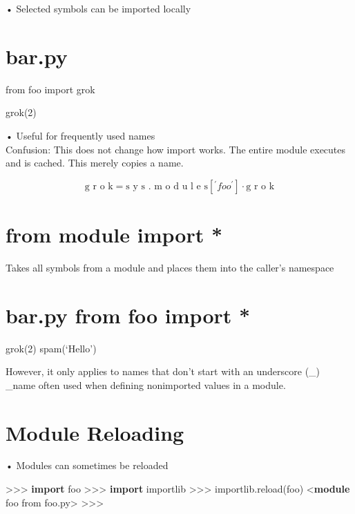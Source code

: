 \documentclass[
  letterpaper,
  DIV=11,
  numbers=noendperiod]{scrreprt}
\newenvironment{Shaded}{\begin{snugshade}}{\end{snugshade}}
\newcommand{\KeywordTok}[1]{\textcolor[rgb]{0.00,0.23,0.31}{\textbf{#1}}}
\newcommand{\NormalTok}[1]{\textcolor[rgb]{0.00,0.23,0.31}{#1}}
\newcommand{\OperatorTok}[1]{\textcolor[rgb]{0.37,0.37,0.37}{#1}}
\begin{document}
• Selected symbols can be imported locally


\chapter{bar.py}\label{bar.py}

from foo import grok

grok(2)

• Useful for frequently used names\\
Confusion: This does not change how import works. The entire module
executes and is cached. This merely copies a name.

\[
\text {g r o k} = \text {s y s . m o d u l e s} [ ^ {\prime} f o o ^ {\prime} ] \cdot \text {g r o k}
\]


\chapter{from module import *}\label{from-module-import-4}

Takes all symbols from a module and places them into the caller's
namespace


\chapter{bar.py from foo import *}\label{bar.py-from-foo-import}

grok(2) spam(`Hello')

However, it only applies to names that don't start with an underscore
(\_)\\
\_name often used when defining nonimported values in a module.


\chapter{Module Reloading}\label{module-reloading}

• Modules can sometimes be reloaded

\begin{Shaded}
\begin{Highlighting}[]
\OperatorTok{\textgreater{}\textgreater{}\textgreater{}} \KeywordTok{import}\NormalTok{ foo   }
\OperatorTok{\textgreater{}\textgreater{}\textgreater{}} \KeywordTok{import}\NormalTok{ importlib   }
\OperatorTok{\textgreater{}\textgreater{}\textgreater{}}\NormalTok{ importlib}\OperatorTok{.}\NormalTok{reload(foo)   }
\OperatorTok{\textless{}}\KeywordTok{module}\NormalTok{ \textquotesingle{}foo\textquotesingle{} from \textquotesingle{}foo}\OperatorTok{.}\NormalTok{py\textquotesingle{}}\OperatorTok{\textgreater{}}   
\OperatorTok{\textgreater{}\textgreater{}\textgreater{}} 
\end{Highlighting}
\end{Shaded}
\end{document}
